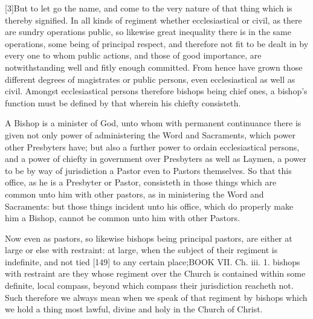 [3]But to let go the name, and come to the very nature of that thing which is thereby signified. In all kinds of regiment whether ecclesiastical or civil, as there are sundry operations public, so likewise great inequality there is in the same operations, some being of principal respect, and therefore not fit to be dealt in by every one to whom public actions, and those of good importance, are notwithstanding well and fitly enough committed. From hence have grown those different degrees of magistrates or public persons, even ecclesiastical as well as civil. Amongst ecclesiastical persons therefore bishops being chief ones, a bishop’s function must be defined by that wherein his chiefty consisteth.

A Bishop is a minister of God, unto whom with permanent continuance there is given not only power of administering the Word and Sacraments, which power other Presbyters have; but also a further power to ordain ecclesiastical persons, and a power of chiefty in government over Presbyters as well as Laymen, a power to be by way of jurisdiction a Pastor even to Pastors themselves. So that this office, as he is a Presbyter or Pastor, consisteth in those things which are common unto him with other pastors, as in ministering the Word and Sacraments: but those things incident unto his office, which do properly make him a Bishop, cannot be common unto him with other Pastors.

Now even as pastors, so likewise bishops being principal pastors, are either at large or else with restraint: at large, when the subject of their regiment is indefinite, and not tied [149] to any certain place;BOOK VII. Ch. iii. 1. bishops with restraint are they whose regiment over the Church is contained within some definite, local compass, beyond which compass their jurisdiction reacheth not. Such therefore we always mean when we speak of that regiment by bishops which we hold a thing most lawful, divine and holy in the Church of Christ.

